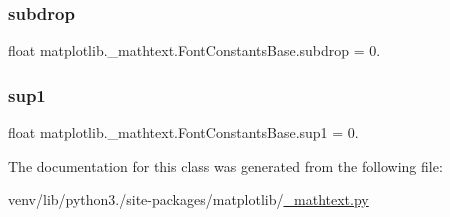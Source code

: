 \subsubsection{\texorpdfstring{subdrop}{subdrop}}
{\footnotesize\ttfamily float matplotlib.\+\_\+mathtext.\+Font\+Constants\+Base.\+subdrop = 0.\hspace{0.3cm}{\ttfamily [static]}}

\mbox{\label{classmatplotlib_1_1__mathtext_1_1FontConstantsBase_ade092be64bba7f65e1a47ca453a1aee3}} 
\subsubsection{\texorpdfstring{sup1}{sup1}}
{\footnotesize\ttfamily float matplotlib.\+\_\+mathtext.\+Font\+Constants\+Base.\+sup1 = 0.\hspace{0.3cm}{\ttfamily [static]}}



The documentation for this class was generated from the following file\+:\begin{DoxyCompactItemize}
\item 
venv/lib/python3./site-\/packages/matplotlib/\hyperlink{__mathtext_8py}{\+\_\+mathtext.\+py}\end{DoxyCompactItemize}
